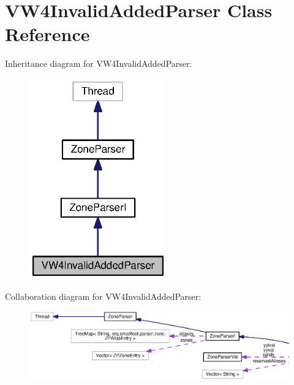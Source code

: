 \section{V\+W4\+Invalid\+Added\+Parser Class Reference}
\label{classorg_1_1smallfoot_1_1parser_1_1zone_1_1VW4InvalidAddedParser}


Inheritance diagram for V\+W4\+Invalid\+Added\+Parser\+:\nopagebreak
\begin{figure}[H]
\begin{center}
\leavevmode
\includegraphics[width=168pt]{classorg_1_1smallfoot_1_1parser_1_1zone_1_1VW4InvalidAddedParser__inherit__graph}
\end{center}
\end{figure}


Collaboration diagram for V\+W4\+Invalid\+Added\+Parser\+:\nopagebreak
\begin{figure}[H]
\begin{center}
\leavevmode
\includegraphics[width=350pt]{classorg_1_1smallfoot_1_1parser_1_1zone_1_1VW4InvalidAddedParser__coll__graph}
\end{center}
\end{figure}
